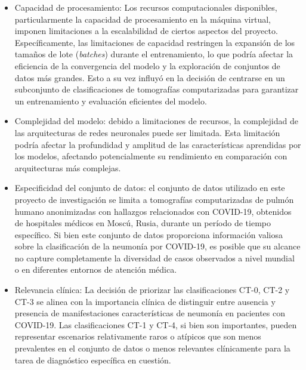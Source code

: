\documentclass[10pt, oneside, a4paper]{article}
\begin{document}
	\begin{itemize}
		
		\item Capacidad de procesamiento: Los recursos computacionales disponibles, particularmente la capacidad de procesamiento en la máquina virtual, imponen limitaciones a la escalabilidad de ciertos aspectos del proyecto. Específicamente, las limitaciones de capacidad restringen la expansión de los tamaños de lote (\textsl{batches}) durante el entrenamiento, lo que podría afectar la eficiencia de la convergencia del modelo y la exploración de conjuntos de datos más grandes. Esto a su vez influyó en la decisión de centrarse en un subconjunto de clasificaciones de tomografías computarizadas para garantizar un entrenamiento y evaluación eficientes del modelo.

		\item Complejidad del modelo: debido a limitaciones de recursos, la complejidad de las arquitecturas de redes neuronales puede ser limitada. Esta limitación podría afectar la profundidad y amplitud de las características aprendidas por los modelos, afectando potencialmente su rendimiento en comparación con arquitecturas más complejas.
		
		\item Especificidad del conjunto de datos: el conjunto de datos utilizado en este proyecto de investigación se limita a tomografías computarizadas de pulmón humano anonimizadas con hallazgos relacionados con COVID-19, obtenidos de hospitales médicos en Moscú, Rusia, durante un período de tiempo específico. Si bien este conjunto de datos proporciona información valiosa sobre la clasificación de la neumonía por COVID-19, es posible que su alcance no capture completamente la diversidad de casos observados a nivel mundial o en diferentes entornos de atención médica.	
		
		\item Relevancia clínica: La decisión de priorizar las clasificaciones CT-0, CT-2 y CT-3 se alinea con la importancia clínica de distinguir entre ausencia y presencia de manifestaciones características de neumonía en pacientes con COVID-19. Las clasificaciones CT-1 y CT-4, si bien son importantes, pueden representar escenarios relativamente raros o atípicos que son menos prevalentes en el conjunto de datos o menos relevantes clínicamente para la tarea de diagnóstico específica en cuestión.
		

\end{itemize}
\end{document}
